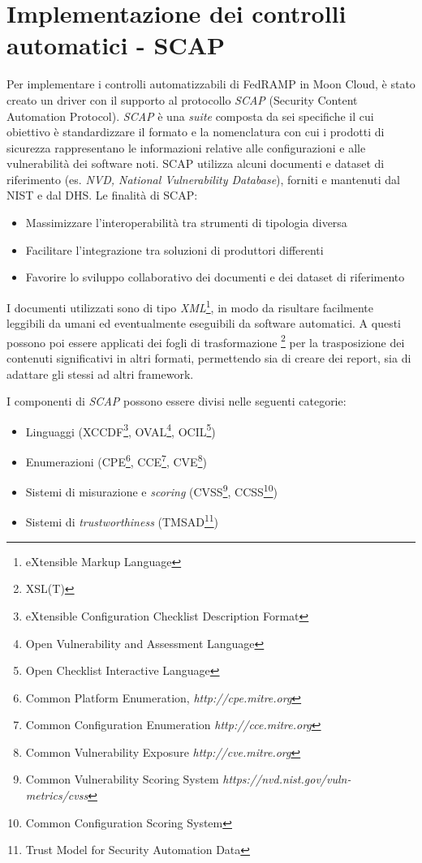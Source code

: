 \documentclass[../main.tex]{subfiles}
\begin{document}
\section{Implementazione dei controlli automatici - SCAP}
Per implementare i controlli automatizzabili di FedRAMP in Moon Cloud, è stato creato un driver con il supporto al protocollo \textit{SCAP} (Security Content Automation Protocol).
\textit{SCAP} è una \textit{suite} composta da sei specifiche il cui obiettivo è standardizzare il formato e la nomenclatura con cui i prodotti di sicurezza rappresentano le informazioni relative alle configurazioni e alle vulnerabilità dei software noti.
SCAP utilizza alcuni documenti e dataset di riferimento (es. \textit{NVD, National Vulnerability Database}), forniti e mantenuti dal NIST e dal DHS.
Le finalità di SCAP:
\begin{itemize}
    \item Massimizzare l'interoperabilità tra strumenti di tipologia diversa
    \item Facilitare l'integrazione tra soluzioni di produttori differenti
    \item Favorire lo sviluppo collaborativo dei documenti e dei dataset di riferimento
\end{itemize}
I documenti utilizzati sono di tipo \textit{XML}\footnote{eXtensible Markup Language}, in modo da risultare facilmente leggibili da umani ed eventualmente eseguibili da software automatici. A questi possono poi essere applicati dei fogli di trasformazione \footnote{XSL(T)} per la trasposizione dei contenuti significativi in altri formati, permettendo sia di creare dei report, sia di adattare gli stessi ad altri framework. 

I componenti di \textit{SCAP} possono essere divisi nelle seguenti categorie:
\begin{itemize}
    \item Linguaggi (XCCDF\footnote{eXtensible Configuration Checklist Description Format}, OVAL\footnote{Open Vulnerability and Assessment Language}, OCIL\footnote{Open Checklist Interactive Language})
    \item Enumerazioni (CPE\footnote{Common Platform Enumeration, \textit{http://cpe.mitre.org}}, CCE\footnote{Common Configuration Enumeration \textit{http://cce.mitre.org}}, CVE\footnote{Common Vulnerability Exposure \textit{http://cve.mitre.org}})
    \item Sistemi di misurazione e \textit{scoring} (CVSS\footnote{Common Vulnerability Scoring System \textit{https://nvd.nist.gov/vuln-metrics/cvss}}, CCSS\footnote{Common Configuration Scoring System})
    \item Sistemi di \textit{trustworthiness} (TMSAD\footnote{Trust Model for Security Automation Data})
\end{itemize}
\end{document}
